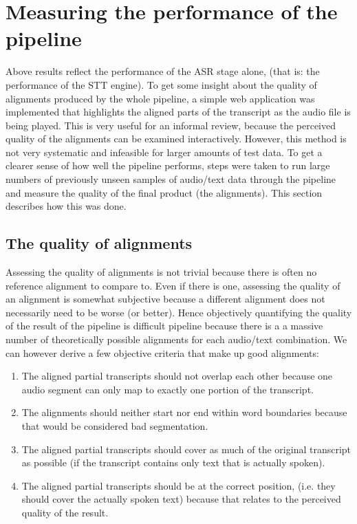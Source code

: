 \section{Measuring the performance of the pipeline}\label{e2e}

Above results reflect the performance of the \ac{ASR} stage alone, (that is: the performance of the \ac{STT} engine). To get some insight about the quality of alignments produced by the whole pipeline, a simple web application was implemented that highlights the aligned parts of the transcript as the audio file is being played. This is very useful for an informal review, because the perceived quality of the alignments can be examined interactively. However, this method is not very systematic and infeasible for larger amounts of test data. To get a clearer sense of how well the pipeline performs, steps were taken to run large numbers of previously unseen samples of audio/text data through the pipeline and measure the quality of the final product (the alignments). This section describes how this was done.

\subsection{The quality of alignments}

Assessing the quality of alignments is not trivial because there is often no reference alignment to compare to. Even if there is one, assessing the quality of an alignment is somewhat subjective because a different alignment does not necessarily need to be worse (or better). Hence objectively quantifying the quality of the result of the pipeline is difficult pipeline because there is a a massive number of theoretically possible alignments for each audio/text combination. We can however derive a few objective criteria that make up good alignments:

\begin{enumerate}
	\item The aligned partial transcripts should not overlap each other because one audio segment can only map to exactly one portion of the transcript.
	\item The alignments should neither start nor end within word boundaries because that would be considered bad segmentation.
	\item The aligned partial transcripts should cover as much of the original transcript as possible (if the transcript contains only text that is actually spoken).
	\item The aligned partial transcripts should be at the correct position, (i.e. they should cover the actually spoken text) because that relates to the perceived quality of the result.
\end{enumerate}

